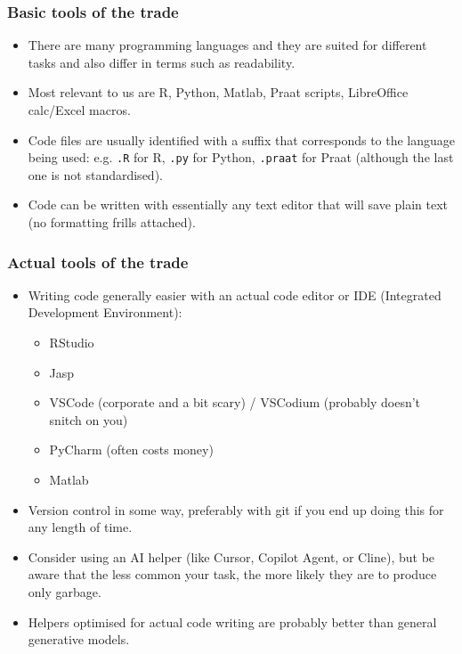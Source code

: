 \documentclass[12pt,aspectratio=169,english,finnish,pdflatex%
]{beamer}
\begin{document}


\begin{frame}[fragile]
  \frametitle{Basic tools of the trade}
  \begin{itemize}
    \item There are many programming languages and they are suited for
    different tasks and also differ in terms such as readability.
    \item Most relevant to us are R, Python, Matlab, Praat scripts, LibreOffice
    calc/Excel macros.
    \item Code files are usually identified with a suffix that corresponds to
    the language being used: e.g. \verb|.R| for R, \verb|.py| for Python,
    \verb|.praat| for Praat (although the last one is not standardised).
    \item Code can be written with essentially any text editor that will save
    plain text (no formatting frills attached).
  \end{itemize}
\end{frame}


\begin{frame}[fragile]
  \frametitle{Actual tools of the trade}
  \begin{itemize}
    \item Writing code generally easier with an actual code editor or IDE (Integrated
    Development Environment):
    \begin{itemize}
      \item RStudio
      \item Jasp
      \item VSCode (corporate and a bit scary) / VSCodium (probably doesn't
      snitch on you)
      \item PyCharm (often costs money)
      \item Matlab
    \end{itemize}
  \item Version control in some way, preferably with git if you end up doing
  this for any length of time. 
  \item Consider using an AI helper (like Cursor, Copilot Agent, or Cline), but
  be aware that the less common your task, the more likely they are to produce
  only garbage.
  \item Helpers optimised for actual code writing are probably better than
  general generative models.
  \end{itemize}
\end{frame}
\end{document}
